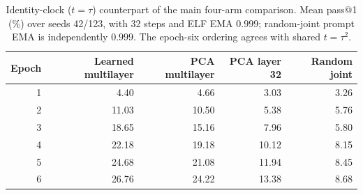 \begin{table}[t]
\caption{Identity-clock ($t=\tau$) counterpart of the main four-arm comparison. Mean pass@1 (\%) over seeds 42/123, with 32 steps and ELF EMA $0.999$; random-joint prompt EMA is independently $0.999$. The epoch-six ordering agrees with shared $t=\tau^2$.}
\label{tab:identityfourarm}
\centering\small
\setlength{\tabcolsep}{4pt}
\begin{tabular}{rrrrr}
\toprule
Epoch & Learned multilayer & PCA multilayer & PCA layer 32 & Random joint \\
\midrule
1 & 4.40 & 4.66 & 3.03 & 3.26 \\
2 & 11.03 & 10.50 & 5.38 & 5.76 \\
3 & 18.65 & 15.16 & 7.96 & 5.80 \\
4 & 22.18 & 19.18 & 10.12 & 8.15 \\
5 & 24.68 & 21.08 & 11.94 & 8.45 \\
6 & 26.76 & 24.22 & 13.38 & 8.68 \\
\bottomrule
\end{tabular}
\end{table}
